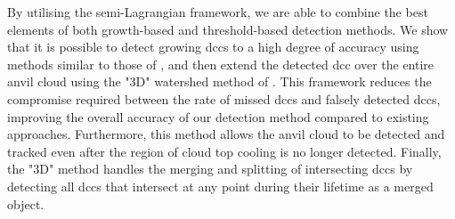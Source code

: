 By utilising the semi-Lagrangian framework, we are able to combine the best elements of both growth-based and threshold-based detection methods.
We show that it is possible to detect growing \acrshort{dcc}s to a high degree of accuracy using methods similar to those of \citet{zinner_cb-tram_2008}, and then extend the detected \acrshort{dcc} over the entire anvil cloud using the "3D" watershed method of \citet{fiolleau_algorithm_2013}.
This framework reduces the compromise required between the rate of missed \acrshort{dcc}s and falsely detected \acrshort{dcc}s, improving the overall accuracy of our detection method compared to existing approaches.
Furthermore, this method allows the anvil cloud to be detected and tracked even after the region of cloud top cooling is no longer detected.
Finally, the "3D" method handles the merging and splitting of intersecting \acrshort{dcc}s by detecting all \acrshort{dcc}s that intersect at any point during their lifetime as a merged object.






